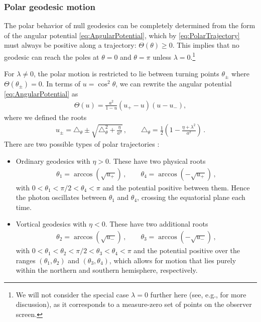 \documentclass[graybox,envcountchap]{svmult}
\newcommand{\pa}[1]{\left(#1\right)}
\begin{document}
\subsubsection*{Polar geodesic motion}

The polar behavior of null geodesics can be completely determined from the form of the angular potential \eqref{eq:AngularPotential}, which by \eqref{eq:PolarTrajectory} must always be positive along a trajectory: $\Theta(\theta)\geq0$.
This implies that no geodesic can reach the poles at $\theta=0$ and $\theta=\pi$ unless $\lambda=0$.\footnote{We will not consider the special case $\lambda=0$ further here (see, e.g., \cite{Kapec2020} for more discussion), as it corresponds to a measure-zero set of points on the observer screen.}

For $\lambda\neq0$, the polar motion is restricted to lie between turning points $\theta_\pm$ where $\Theta(\theta_\pm)=0$.
In terms of $u=\cos^2{\theta}$, we can rewrite the angular potential \eqref{eq:AngularPotential} as
\begin{align}
    \label{eq:PolarPotential}
    \Theta(u)=\frac{a^2}{1-u}\pa{u_+-u}\pa{u-u_-},
\end{align}
where we defined the roots
\begin{align}
    \label{eq:PolarRoots}
    u_\pm=\triangle_\theta\pm\sqrt{\triangle_\theta^2+\frac{\eta}{a^2}}\,,\qquad
    \triangle_\theta=\frac{1}{2}\pa{1-\frac{\eta+\lambda^2}{a^2}}\,.
\end{align}
There are two possible types of polar trajectories \cite{Kapec2020,GrallaLupsasca2020b}:
\begin{itemize}
    \item Ordinary geodesics with $\eta>0$.
    These have two physical roots
    \begin{align}
        \label{eq:TurningPoints}
        \theta_1=\arccos\pa{\sqrt{u_+}}\,,\qquad
        \theta_4=\arccos\pa{-\sqrt{u_+}}\,,
    \end{align}
    with $0<\theta_1<\pi/2<\theta_4<\pi$ and the potential positive between them.
    Hence the photon oscillates between $\theta_1$ and $\theta_4$, crossing the equatorial plane each time.
    \item Vortical geodesics with $\eta<0$.
    These have two additional roots
    \begin{align}
        \theta_2=\arccos\pa{\sqrt{u_-}}\,,\qquad
        \theta_3=\arccos\pa{-\sqrt{u_-}}\,,
    \end{align}
    with $0<\theta_1<\theta_2<\pi/2<\theta_3<\theta_4<\pi$ and the potential positive over the ranges $(\theta_1,\theta_2)$ and $(\theta_3,\theta_4)$, which allows for motion that lies purely within the northern and southern hemisphere, respectively.
\end{itemize}
\end{document}

